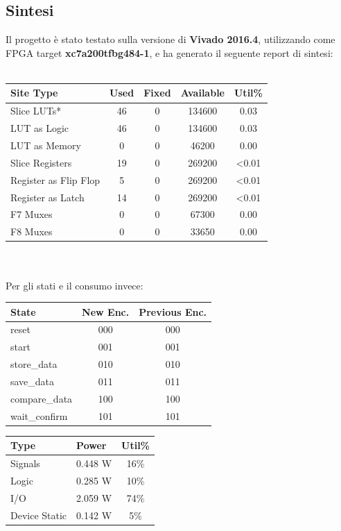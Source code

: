 \documentclass[12pt]{article}
\begin{document}
\subsection{Sintesi}
Il progetto è stato testato sulla versione di \textbf{Vivado 2016.4}, utilizzando come FPGA target \textbf{xc7a200tfbg484-1}, e ha generato il seguente report di sintesi:\\
\\
\begin{tabular}{lcccc}
    \toprule
    Site Type                   & Used & Fixed & Available & Util\% \\
    \midrule
    Slice LUTs*                 & 46   & 0     & 134600    & 0.03   \\
    \quad LUT as Logic          & 46   & 0     & 134600    & 0.03   \\
    \quad LUT as Memory         & 0    & 0     & 46200     & 0.00   \\
    Slice Registers             & 19   & 0     & 269200    & <0.01  \\
    \quad Register as Flip Flop & 5    & 0     & 269200    & <0.01  \\
    \quad Register as Latch     & 14   & 0     & 269200    & <0.01  \\
    F7 Muxes                    & 0    & 0     & 67300     & 0.00   \\
    F8 Muxes                    & 0    & 0     & 33650     & 0.00   \\
    \bottomrule
\end{tabular}
\\
\\Per gli stati e il consumo invece:\newline\newline
\begin{tabular}[t]{lcc}
    \toprule
    State         & New Enc. & Previous Enc. \\
    \midrule
    reset         & 000      & 000           \\
    start         & 001      & 001           \\
    store\_data   & 010      & 010           \\
    save\_data    & 011      & 011           \\
    compare\_data & 100      & 100           \\
    wait\_confirm & 101      & 101           \\
    \bottomrule
\end{tabular}
\quad
\begin{tabular}[t]{llc}
    \toprule
    Type          & Power   & Util\% \\
    \midrule
    Signals       & 0.448 W & 16\%   \\
    Logic         & 0.285 W & 10\%   \\
    I/O           & 2.059 W & 74\%   \\
    Device Static & 0.142 W & 5\%    \\
    \bottomrule
\end{tabular}
\end{document}
